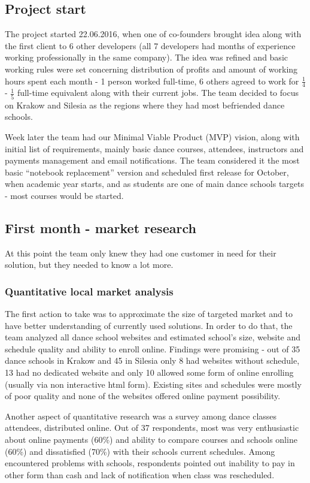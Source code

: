 \documentclass{article}
\begin{document}
\subsection{Project start}
The project started 22.06.2016, when one of co-founders brought idea along with the first client to 6 other developers (all 7 developers had months of experience working professionally in the same company). The idea was refined and basic working rules were set concerning distribution of profits and amount of working hours spent each month - 1 person worked full-time, 6 others agreed to work for \( \frac{1}{4} \) - \( \frac{1}{5} \) full-time equivalent along with their current jobs. The team decided to focus on Krakow and Silesia as the regions where they had most befriended dance schools.

Week later the team had our Minimal Viable Product (MVP) vision, along with initial list of requirements, mainly basic dance courses, attendees, instructors and payments management and email notifications. The team considered it the most basic ``notebook replacement'' version and scheduled first release for October, when academic year starts, and as students are one of main dance schools targets - most courses would be started.

\subsection{First month - market research}
At this point the team only knew they had one customer in need for their solution, but they needed to know a lot more.

\subsubsection{Quantitative local market analysis}
The first action to take was to approximate the size of targeted market and to have better understanding of currently used solutions. In order to do that, the team analyzed all dance school websites and estimated school's size, website and schedule quality and ability to enroll online. Findings were promising - out of 35 dance schools in Krakow and 45 in Silesia only 8 had websites without schedule, 13 had no dedicated website and only 10 allowed some form of online enrolling (usually via non interactive html form). Existing sites and schedules were mostly of poor quality and none of the websites offered online payment possibility.

Another aspect of quantitative research was a survey among dance classes attendees, distributed online. Out of 37 respondents, most was very enthusiastic about online payments (60\%) and ability to compare courses and schools online (60\%) and dissatisfied (70\%) with their schools current schedules. Among encountered problems with schools, respondents pointed out inability to pay in other form than cash and lack of notification when class was rescheduled.
\end{document}
